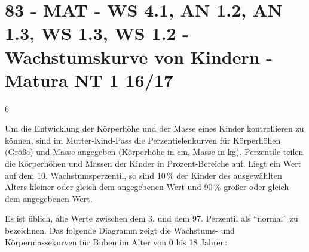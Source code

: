 \section{83 - MAT - WS 4.1, AN 1.2, AN 1.3, WS 1.3, WS 1.2 - Wachstumskurve von Kindern - Matura NT 1 16/17}

\begin{langesbeispiel} \item[6] %

Um die Entwicklung der Körperhöhe und der Masse eines Kinder kontrollieren zu können, sind im Mutter-Kind-Pass die Perzentielenkurven für Körperhöhen (Größe) und Masse angegeben (Körperhöhe in cm, Masse in kg). Perzentile teilen die Körperhöhen und Massen der Kinder in Prozent-Bereiche auf. Liegt ein Wert auf dem 10. Wachstumsperzentil, so sind 10\,\% der Kinder des ausgewählten Alters kleiner oder gleich dem angegebenen Wert und 90\,\% größer oder gleich dem angegebenen Wert.

Es ist üblich, alle Werte zwischen dem 3. und dem 97. Perzentil als "`normal"' zu bezeichnen. Das folgende Diagramm zeigt die Wachstums- und Körpermassekurven für Buben im Alter von 0 bis 18 Jahren:

\begin{center}
\end{center}


\end{langesbeispiel}
